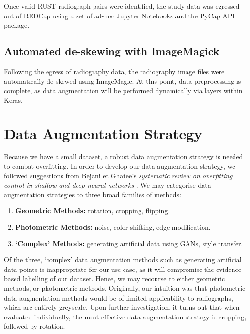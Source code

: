 Once valid RUST-radiograph pairs were identified, the study data was egressed out of REDCap using a set of ad-hoc Jupyter Notebooks and the PyCap API package. \autocite{pycap}

\subsection{Automated de-skewing with ImageMagick}
Following the egress of radiography data, the radiography image files were automatically de-skewed using ImageMagic. At this point, data-preprocessing is complete, as data augmentation will be performed dynamically via layers within Keras.

\section{Data Augmentation Strategy}

Because we have a small dataset, a robust data augmentation strategy is needed to combat overfitting. In order to develop our data augmentation strategy, we followed suggestions from Bejani et Ghatee's \emph{systematic review on overfitting control in shallow and deep neural networks} \autocite{overfitting-prevention}. We may categorise data augmentation strategies to three broad families of methods: \autocite{augmentation-strategies}

\begin{enumerate}
    \item \textbf{Geometric Methods:} rotation, cropping, flipping.
    \item \textbf{Photometric Methods:} noise, color-shifting, edge modification.
    \item \textbf{\enquote*{Complex} Methods:} generating artificial data using GANs, style transfer.
\end{enumerate}

\noindent
Of the three, \enquote*{complex} data augmentation methods such as generating artificial data points is inappropriate for our use case, as it will compromise the evidence-based labelling of our dataset. Hence, we may recourse to either geometric methods, or photometric methods. Originally, our intuition was that photometric data augmentation methods would be of limited applicability to radiographs, which are entirely greyscale. Upon further investigation, it turns out that when evaluated individually, the most effective data augmentation strategy is cropping, followed by rotation. \autocite{benchmark}

